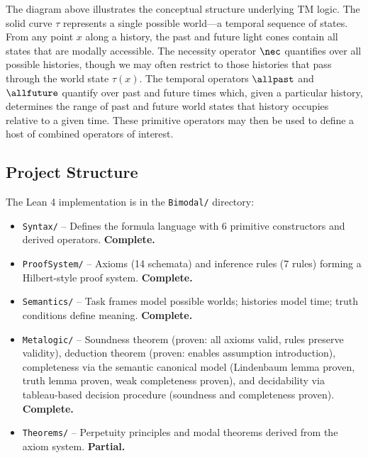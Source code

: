 \documentclass[../BimodalReference.tex]{subfiles}
\begin{document}
\noindent
The diagram above illustrates the conceptual structure underlying TM logic.
The solid curve $\tau$ represents a single possible world---a temporal sequence of states.
From any point $x$ along a history, the past and future light cones contain all states that are modally accessible.
The necessity operator $\nec$ quantifies over all possible histories, though we may often restrict to those histories that pass through the world state $\tau(x)$.
The temporal operators $\allpast$ and $\allfuture$ quantify over past and future times which, given a particular history, determines the range of past and future world states that history occupies relative to a given time.
These primitive operators may then be used to define a host of combined operators of interest.

\subsection*{Project Structure}

The Lean 4 implementation is in the \texttt{Bimodal/} directory:
\begin{itemize}
  \item \texttt{Syntax/} -- Defines the formula language with 6 primitive constructors and derived operators.
  \textbf{Complete.}
  \item \texttt{ProofSystem/} -- Axioms (14 schemata) and inference rules (7 rules) forming a Hilbert-style proof system.
  \textbf{Complete.}
  \item \texttt{Semantics/} -- Task frames model possible worlds; histories model time; truth conditions define meaning.
  \textbf{Complete.}
  \item \texttt{Metalogic/} -- Soundness theorem (proven: all axioms valid, rules preserve validity), deduction theorem (proven: enables assumption introduction), completeness via the semantic canonical model (Lindenbaum lemma proven, truth lemma proven, weak completeness proven), and decidability via tableau-based decision procedure (soundness and completeness proven).
  \textbf{Complete.}
  \item \texttt{Theorems/} -- Perpetuity principles and modal theorems derived from the axiom system.
  \textbf{Partial.}
\end{itemize}
\end{document}

